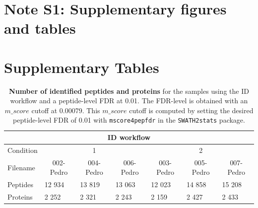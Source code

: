 \documentclass[11pt]{article}
\begin{document}
\maketitle

\section*{Note S1: Supplementary figures and tables}
\label{sec:fc-eval}

\section*{Supplementary Tables}

\begin{table}[h]
    \begin{tabular}{lllllll}
    \hline
    \multicolumn{7}{c}{ID workflow}                                                                                                                                                                                   \\ \hline
    Condition & \multicolumn{3}{c}{1}                                                                         & \multicolumn{3}{c}{2}                                                                         \\
    Filename       & \multicolumn{1}{c}{002-Pedro} & \multicolumn{1}{c}{004-Pedro} & \multicolumn{1}{c}{006-Pedro} & \multicolumn{1}{c}{003-Pedro} & \multicolumn{1}{c}{005-Pedro} & \multicolumn{1}{c}{007-Pedro} \\
    Peptides  & 12 934                        & 13 819                        & 13 063                        & 12 023                        & 14 858                        & 15 208                        \\
    Proteins  & 2 252                         & 2 321                         & 2 243                         & 2 159                         & 2 427                         & 2 433                         \\ \hline
    \end{tabular}
     \caption{{\bf Number of identified peptides and proteins} for the samples using the ID workflow and a peptide-level FDR at 0.01. The FDR-level is obtained with an $m\_score$ cutoff at 0.00079. This $m\_score$ cutoff is computed by setting the desired peptide-level FDR of 0.01 with \texttt{mscore4pepfdr} in the \texttt{SWATH2stats} package.
          \label{fig:osw_peptide_and_protein_id}}
\end{table}
        
\end{document}
